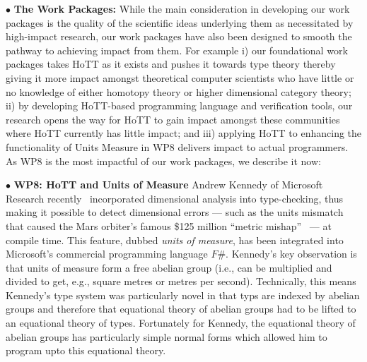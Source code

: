 \documentclass[a4paper,11pt]{article}
\begin{document}
\vspace*{0.02in}

$\bullet$ {\bf The Work Packages:} While the main consideration in
developing our work packages is the quality of the scientific ideas
underlying them as necessitated by high-impact research, our work
packages have also been designed to smooth the pathway to achieving
impact from them. For example i) our foundational work packages takes
HoTT as it exists and pushes it towards type theory thereby giving it 
more impact amongst  theoretical computer scientists who have little or
no knowledge of either homotopy theory or higher dimensional category
theory; ii) by developing HoTT-based programming language and
verification tools, our research opens the way for HoTT to gain impact
amongst these communities where HoTT currently has little impact; and 
iii) applying HoTT to enhancing the functionality of Units Measure
in WP8 delivers impact to actual programmers. As WP8 is the most
impactful of our work packages, we describe it now:

\vspace*{0.02in}

$\bullet$ {\bf WP8: HoTT and Units of Measure} Andrew Kennedy of
Microsoft Research recently~\cite{aknn97} incorporated dimensional
analysis into type-checking, thus making it possible to detect
dimensional errors --- such as the units mismatch that caused the Mars
orbiter's famous \$125 million ``metric mishap''~\cite{wp99} --- at
compile time. This feature, dubbed {\em units of measure}, has been
integrated into Microsoft's commercial programming language $F\#$.
Kennedy's key observation is that units of measure form a free abelian
group (i.e., can be multiplied and divided to get, e.g., square metres
or metres per second). Technically, this means Kennedy's type system
was particularly novel in that typs are indexed by abelian groups and
therefore that equational theory of abelian groups
had to be lifted to an equational theory of types. Fortunately for
Kennedy, the equational theory of abelian groups has particularly
simple normal forms which allowed him to program upto this equational
theory.
\end{document}
